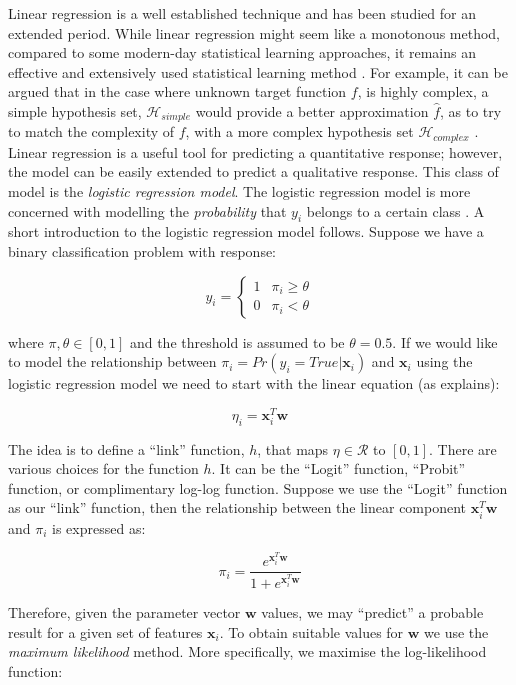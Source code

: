 Linear regression is a well established technique and has been studied for an extended period. While linear regression might seem like a monotonous method, compared to some modern-day statistical learning approaches, it remains an effective and extensively used statistical learning method \citep{james2013introduction}. For example, it can be argued that in the case where unknown target function $f$, is highly complex, a simple hypothesis set, $\mathcal{H}_{simple}$ would provide a better approximation $\hat{f}$, as to try to match the complexity of $f$, with a more complex hypothesis set $\mathcal{H}_{complex}$ \citep{abu2012learning}. Linear regression is a useful tool for predicting a quantitative response; however, the model can be easily extended to predict a qualitative response. This class of model is the \textit{logistic regression model}. The logistic regression model is more concerned with modelling the \textit{probability} that $y_i$ belongs to a certain class \citep{james2013introduction}. A short introduction to the logistic regression model follows. Suppose we have a binary classification problem with response:


$$y_i = \left \{\begin{array}{ll} 
 1 & \pi_i \geq \theta  \\ 
 0 & \pi_i < \theta  
\end{array} \right.
$$

where $\pi,\theta \in [0,1]$ and the threshold is assumed to be $\theta = 0.5$. If we would like to model the relationship between $\pi_i = Pr(y_i = True|\boldsymbol{x}_i)$ and $\boldsymbol{x}_i$ using the logistic regression model we need to start with the linear equation (as  \citet*{et2020analytics} explains):

$$\eta_i = \boldsymbol{x}_i^T\boldsymbol{w}$$

The idea is to define a ``link'' function, $h$, that maps $\eta \in \mathcal{R}$ to $[0,1]$. There are various choices for the function $h$. It can be the ``Logit'' function, ``Probit'' function, or complimentary log-log function. Suppose we use the ``Logit'' function as our ``link'' function, then the relationship between the linear component $\boldsymbol{x}_i^T\boldsymbol{w}$  and $\pi_i$ is expressed as:

$$\pi_i =  \frac{e^{\boldsymbol{x}_i^T\boldsymbol{w}}}{1 + e^{\boldsymbol{x}_i^T\boldsymbol{w}}}$$

Therefore, given the parameter vector $\boldsymbol{w}$ values, we may ``predict'' a probable result for a given set of features $\boldsymbol{x}_i$. To obtain suitable values for $\boldsymbol{w}$ we use the \textit{maximum likelihood} method. More specifically, we maximise the log-likelihood function:


